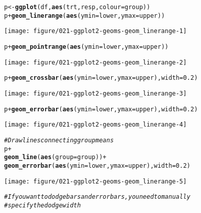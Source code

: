 \documentclass[a4paper,titlepage]{tufte-handout}\usepackage[]{graphicx}\usepackage[]{color}
\makeatletter
\def\maxwidth{ %
  \ifdim\Gin@nat@width>\linewidth
    \linewidth
  \else
    \Gin@nat@width
  \fi
}
\newcommand{\hlnum}[1]{\textcolor[rgb]{0.686,0.059,0.569}{#1}}%
\newcommand{\hlcom}[1]{\textcolor[rgb]{0.678,0.584,0.686}{\textit{#1}}}%
\newcommand{\hlopt}[1]{\textcolor[rgb]{0,0,0}{#1}}%
\newcommand{\hlstd}[1]{\textcolor[rgb]{0.345,0.345,0.345}{#1}}%
\newcommand{\hlkwb}[1]{\textcolor[rgb]{0.69,0.353,0.396}{#1}}%
\newcommand{\hlkwc}[1]{\textcolor[rgb]{0.333,0.667,0.333}{#1}}%
\newcommand{\hlkwd}[1]{\textcolor[rgb]{0.737,0.353,0.396}{\textbf{#1}}}%
\newenvironment{kframe}{%
 \def\at@end@of@kframe{}%
 \ifinner\ifhmode%
  \def\at@end@of@kframe{\end{minipage}}%
  \begin{minipage}{\columnwidth}%
 \fi\fi%
 \def\FrameCommand##1{\hskip\@totalleftmargin \hskip-\fboxsep
 \colorbox{shadecolor}{##1}\hskip-\fboxsep
     \hskip-\linewidth \hskip-\@totalleftmargin \hskip\columnwidth}%
 \MakeFramed {\advance\hsize-\width
   \@totalleftmargin\z@ \linewidth\hsize
   \@setminipage}}%
 {\par\unskip\endMakeFramed%
 \at@end@of@kframe}
\newenvironment{knitrout}{}{} %
\makeatother
\begin{document}
\begin{knitrout}
\begin{kframe}
\begin{alltt}
\hlstd{p} \hlkwb{<-} \hlkwd{ggplot}\hlstd{(df,} \hlkwd{aes}\hlstd{(trt, resp,} \hlkwc{colour} \hlstd{= group))}
\hlstd{p} \hlopt{+} \hlkwd{geom_linerange}\hlstd{(}\hlkwd{aes}\hlstd{(}\hlkwc{ymin} \hlstd{= lower,} \hlkwc{ymax} \hlstd{= upper))}
\end{alltt}
\end{kframe}
\texttt{[image: figure/021-ggplot2-geoms-geom\_linerange-1]} 
\begin{kframe}\begin{alltt}
\hlstd{p} \hlopt{+} \hlkwd{geom_pointrange}\hlstd{(}\hlkwd{aes}\hlstd{(}\hlkwc{ymin} \hlstd{= lower,} \hlkwc{ymax} \hlstd{= upper))}
\end{alltt}
\end{kframe}
\texttt{[image: figure/021-ggplot2-geoms-geom\_linerange-2]} 
\begin{kframe}\begin{alltt}
\hlstd{p} \hlopt{+} \hlkwd{geom_crossbar}\hlstd{(}\hlkwd{aes}\hlstd{(}\hlkwc{ymin} \hlstd{= lower,} \hlkwc{ymax} \hlstd{= upper),} \hlkwc{width} \hlstd{=} \hlnum{0.2}\hlstd{)}
\end{alltt}
\end{kframe}
\texttt{[image: figure/021-ggplot2-geoms-geom\_linerange-3]} 
\begin{kframe}\begin{alltt}
\hlstd{p} \hlopt{+} \hlkwd{geom_errorbar}\hlstd{(}\hlkwd{aes}\hlstd{(}\hlkwc{ymin} \hlstd{= lower,} \hlkwc{ymax} \hlstd{= upper),} \hlkwc{width} \hlstd{=} \hlnum{0.2}\hlstd{)}
\end{alltt}
\end{kframe}
\texttt{[image: figure/021-ggplot2-geoms-geom\_linerange-4]} 
\begin{kframe}\begin{alltt}
\hlcom{# Draw lines connecting group means}
\hlstd{p} \hlopt{+}
  \hlkwd{geom_line}\hlstd{(}\hlkwd{aes}\hlstd{(}\hlkwc{group} \hlstd{= group))} \hlopt{+}
  \hlkwd{geom_errorbar}\hlstd{(}\hlkwd{aes}\hlstd{(}\hlkwc{ymin} \hlstd{= lower,} \hlkwc{ymax} \hlstd{= upper),} \hlkwc{width} \hlstd{=} \hlnum{0.2}\hlstd{)}
\end{alltt}
\end{kframe}
\texttt{[image: figure/021-ggplot2-geoms-geom\_linerange-5]} 
\begin{kframe}\begin{alltt}
\hlcom{# If you want to dodge bars and errorbars, you need to manually}
\hlcom{# specify the dodge width}

\end{alltt}
\end{kframe}
\end{knitrout}
\end{document}
